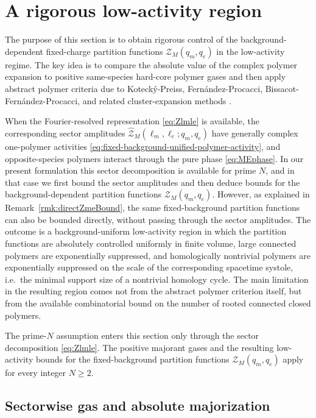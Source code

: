 \section{A rigorous low-activity region}
\label{sec:low-activity}

The purpose of this section is to obtain rigorous control of the background-dependent
fixed-charge partition functions
\(\mathcal Z_M(q_m,q_e)\) in the low-activity regime. The key idea is to compare the
absolute value of the complex polymer expansion to positive same-species hard-core polymer
gases and then apply abstract polymer criteria due to Koteck\'y-Preiss,
Fern\'andez-Procacci, Bissacot-Fern\'andez-Procacci, and related cluster-expansion
methods
\cite{KoteckyPreiss1986,FernandezProcacci2007,BissacotFernandezProcacci2010,Ueltschi2004}.

When the Fourier-resolved representation \eqref{eq:Zlmle} is available, the corresponding sector amplitudes \(\widehat{\mathcal Z}_M(\ell_m,\ell_e;q_m,q_e)\) have generally complex one-polymer activities \eqref{eq:fixed-background-unified-polymer-activity}, and opposite-species polymers interact through the pure phase \eqref{eq:MEphase}. In our present formulation this sector decomposition is available for prime \(N\), and in that case we first bound the sector amplitudes and then deduce bounds for the background-dependent partition functions \(\mathcal Z_M(q_m,q_e)\). However, as explained in Remark~\ref{rmk:directZmeBound}, the same fixed-background partition functions can also be bounded directly, without passing through the sector amplitudes. The outcome is a background-uniform low-activity region in which the partition functions are absolutely controlled uniformly in finite volume, large connected polymers are exponentially suppressed, and homologically nontrivial polymers are exponentially suppressed on the scale of the corresponding spacetime systole, i.e.\ the minimal support size of a nontrivial homology cycle. The main limitation in the resulting region comes not from the abstract polymer criterion itself, but from the available combinatorial bound on the number of rooted connected closed polymers.

The prime-\(N\) assumption enters this section only through the sector
decomposition \eqref{eq:Zlmle}. The positive majorant gases and the resulting low-activity
bounds for the fixed-background partition functions \(\mathcal Z_M(q_m,q_e)\) apply for
every integer \(N\ge 2\).

\subsection{Sectorwise gas and absolute majorization}
\label{sec:low-activity-abstract-polymer}

